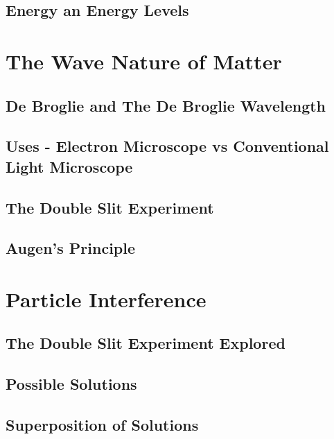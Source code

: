 \documentclass[colorlinks,11pt,a4paper,normalphoto,withhyper,ragged2e]{altareport}
\begin{document}
	
	\subsection{Energy an Energy Levels}
	
	
	\pagebreak
	
	
	
	
\section{The Wave Nature of Matter}
	
	\subsection{De Broglie and The De Broglie Wavelength}
	
	
	\subsection{Uses - Electron Microscope vs Conventional Light Microscope}
	
	
	\subsection{The Double Slit Experiment}
	
	
	\subsection{Augen’s Principle}
	
	
	\pagebreak
	
	
	
	
\section{Particle Interference}
	
	\subsection{The Double Slit Experiment Explored}
	
	
	\subsection{Possible Solutions}
	
	
	\subsection{Superposition of Solutions}
	
\end{document}
